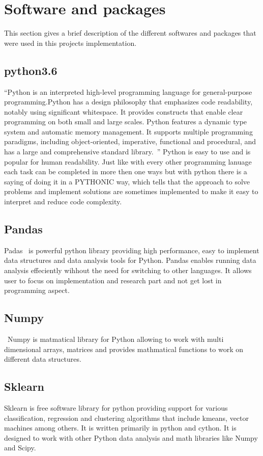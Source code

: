 \section{Software and packages}
This section gives a brief description of the different softwares and
packages that were used in this projects implementation.

\subsection{python3.6}
``Python is an interpreted high-level programming language for
general-purpose programming.Python has a design philosophy that
emphasizes code readability, notably using significant whitespace. It
provides constructs that enable clear programming on both small and
large scales. Python features a dynamic type system and automatic
memory management. It supports multiple programming paradigms,
including object-oriented, imperative, functional and procedural, and
has a large and comprehensive standard
library.~\cite{hid-sp18-413-python}'' Python is easy to use and is
popular for human readability. Just like with every other programming
lanuage each task can be completed in more then one ways but with
python there is a saying of doing it in a PYTHONIC way, which tells
that the approach to solve problems and implement solutions are
sometimes implemented to make it easy to interpret and reduce code
complexity.

\subsection{Pandas}

Padas~\cite{hid-sp18-413-pandas} is powerful python library providing
high performance, easy to implement data structures and data analysis
tools for Python. Pandas enables running data analysis effeciently
wihhout the need for switching to other languages. It allows user to
focus on implementation and research part and not get lost in
programming aspect.

\subsection{Numpy}
~\cite{}Numpy is matmatical library for Python allowing to work with multi
dimensional arrays, matrices and provides mathmatical functions to
work on different data structures. 

\subsection{Sklearn}
Sklearn is free software library for python providing support for
various classification, regression and clustering algorithms that
include kmeans, vector machines among others. It is written primarily
in python and cython. It is designed to work with other Python data
analysis and math libraries like Numpy and Scipy.


